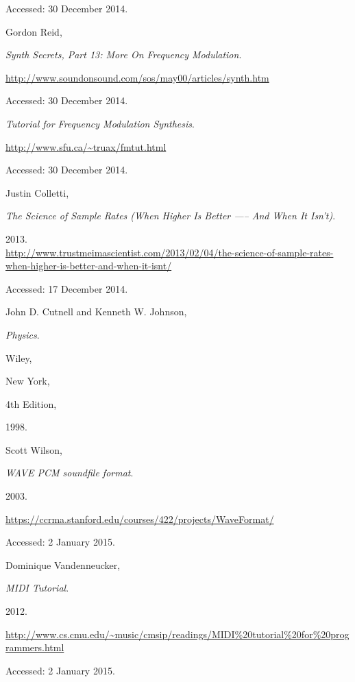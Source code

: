 \begin{thebibliography}{99}
  Accessed: 30 December 2014.


  Gordon Reid,

  \emph{Synth Secrets, Part 13: More On Frequency Modulation}.

  \url{http://www.soundonsound.com/sos/may00/articles/synth.htm}

  Accessed: 30 December 2014.


  \emph{Tutorial for Frequency Modulation Synthesis}.

  \url{http://www.sfu.ca/~truax/fmtut.html}

  Accessed: 30 December 2014.


  Justin Colletti,

  \emph{The Science of Sample Rates (When Higher Is Better —-- And When It Isn't)}.

  2013.\\
  \url{http://www.trustmeimascientist.com/2013/02/04/the-science-of-sample-rates-when-higher-is-better-and-when-it-isnt/}

  Accessed: 17 December 2014.


  John D. Cutnell and Kenneth W. Johnson,

  \emph{Physics}.

  Wiley,

  New York,

  4th Edition,

  1998.


  Scott Wilson,

  \emph{WAVE PCM soundfile format}.

  2003.

  \url{https://ccrma.stanford.edu/courses/422/projects/WaveFormat/}

  Accessed: 2 January 2015.


  Dominique Vandenneucker,

  \emph{MIDI Tutorial}.

  2012.

  \url{http://www.cs.cmu.edu/~music/cmsip/readings/MIDI%20tutorial%20for%20programmers.html}

  Accessed: 2 January 2015.



\end{thebibliography}
